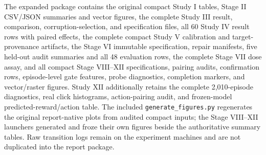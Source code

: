 \documentclass[10pt]{article}
\begin{document}
The expanded package contains the original compact Study I tables, Stage II CSV/JSON summaries and vector figures, the complete Study III result, comparison, corruption-selection, and specification files, all 60 Study IV result rows with paired effects, the complete compact Study V calibration and target-provenance artifacts, the Stage VI immutable specification, repair manifests, five held-out audit summaries and all 48 evaluation rows, the complete Stage VII dose assay, and all compact Stage VIII--XII specifications, pairing audits, confirmation rows, episode-level gate features, probe diagnostics, completion markers, and vector/raster figures. Study XII additionally retains the complete 2,010-episode diagnostics, real click histograms, action-pairing audit, and frozen-model predicted-reward/action table. The included \texttt{generate\_figures.py} regenerates the original report-native plots from audited compact inputs; the Stage VIII--XII launchers generated and froze their own figures beside the authoritative summary tables. Raw transition logs remain on the experiment machines and are not duplicated into the report package.



\end{document}
